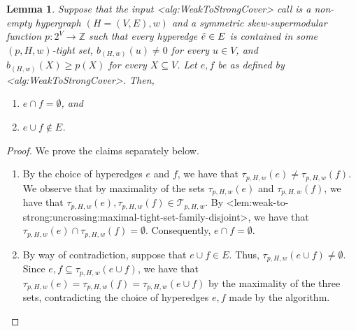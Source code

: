 \documentclass{article}
\def\Cref#1{<#1>}%
\newtheorem{lemma}{Lemma}[section]
\newcommand{\maximalTightSetFamily}[1]{\ensuremath{\calT_{#1}}\xspace}
\newcommand{\maximalTightSetContainingHyperedge}[1]{\ensuremath{\tau_{#1}}\xspace}
\providecommand{\Z}{\mathbb{Z}}
\providecommand{\calT}{\mathcal{T}}
\begin{document}
\begin{lemma}\label{lem:WeakToStrongCover:properties-of-e-and-f-chosen-during-alg}
    Suppose that the input \Cref{alg:WeakToStrongCover} call is a non-empty hypergraph $(H = (V, E), w)$ and a symmetric skew-supermodular function $p:2^V\rightarrow \Z$ %
such that every hyperedge $\Tilde{e} \in E$ is contained in some $(p, H, w)$-tight set, $b_{(H,w)}(u) \not = 0$ for every $u \in V$, and $b_{(H,w)}(X) \geq p(X)$ for every $X \subseteq V$.  Let $e, f$ be as defined by \Cref{alg:WeakToStrongCover}. Then,
\begin{enumerate}
    \item $e \cap f = \emptyset$, and
    \item $e\cup f \not \in E$.
\end{enumerate}
\end{lemma}
\begin{proof} We prove the claims separately below.
    \begin{enumerate}
        \item By the choice of hyperedges $e$ and $f$, we have that $\maximalTightSetContainingHyperedge{p, H, w}(e) \not = \maximalTightSetContainingHyperedge{p, H, w}(f)$. We observe that by maximality of the sets $\maximalTightSetContainingHyperedge{p, H, w}(e)$ and $\maximalTightSetContainingHyperedge{p, H, w}(f)$, we have that $\maximalTightSetContainingHyperedge{p, H, w}(e), \maximalTightSetContainingHyperedge{p, H, w}(f) \in \maximalTightSetFamily{p, H, w}$. By \Cref{lem:weak-to-strong:uncrossing:maximal-tight-set-family-disjoint}, we have that $\maximalTightSetContainingHyperedge{p, H, w}(e) \cap  \maximalTightSetContainingHyperedge{p, H, w}(f) = \emptyset$. Consequently, $e \cap f = \emptyset$.
        \item By way of contradiction, suppose that $e\cup f \in E$. Thus, $\maximalTightSetContainingHyperedge{p, H, w}(e\cup f) \not = \emptyset$. Since $e, f \subseteq \maximalTightSetContainingHyperedge{p, H, w}(e\cup f)$, we have that $\maximalTightSetContainingHyperedge{p, H, w}(e) = \maximalTightSetContainingHyperedge{p, H, w}(f) = \maximalTightSetContainingHyperedge{p, H, w}(e\cup f)$ by the maximality of the three sets, contradicting the choice of hyperedges $e, f$ made by the algorithm.
    \end{enumerate}
\end{proof}
\end{document}
